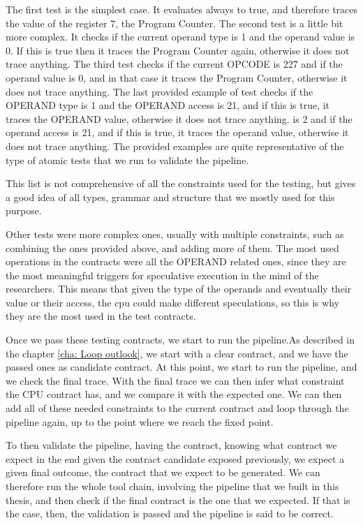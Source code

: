 The first test is the simplest case. It evaluates always to true, and therefore traces
the value of the register 7, the Program Counter. The second test is a little bit
more complex. It checks if the current operand type is 1 and the operand value
is 0. If this is true then it traces the Program Counter again, otherwise it does
not trace anything. The third test checks if the current OPCODE is 227 and if
the operand value is 0, and in that case it traces the Program Counter,
otherwise it does not trace anything. The last provided example of test checks if
the OPERAND type is 1 and the OPERAND access is 21, and if this is true, it traces
the OPERAND value, otherwise it does not trace anything. is 2 and if the operand
access is 21, and if this is true, it traces the operand value, otherwise it
does not trace anything. The provided examples are quite representative of the type
of atomic tests that we run to validate the pipeline.

This list is not comprehensive of all the constraints used for the testing, but
gives a good idea of all types, grammar and structure that we mostly used for this
purpose.

Other tests were more complex ones, usually with multiple constraints, such as combining
the ones provided above, and adding more of them. The most used operations in the
contracts were all the OPERAND related ones, since they are the most meaningful
triggers for speculative execution in the mind of the researchers. This means that
given the type of the operands and eventually their value or their access, the
cpu could make different speculations, so this is why they are the most used in the
test contracts.

Once we pass these testing contracts, we start to run the pipeline.As described
in the chapter \ref{cha: Loop outlook}, we start with a clear contract, and we
have the passed ones as candidate contract. At this point, we start to run the
pipeline, and we check the final trace. With the final trace we can then infer
what constraint the CPU contract has, and we compare it with the expected one.
We can then add all of these needed constraints to the current contract and loop
through the pipeline again, up to the point where we reach the fixed point.

To then validate the pipeline, having the contract, knowing what contract we expect
in the end given the contract candidate exposed previously, we expect a given
final outcome, the contract that we expect to be generated. We can therefore run
the whole tool chain, involving the pipeline that we built in this thesis, and
then check if the final contract is the one that we expected. If that is the case,
then, the validation is passed and the pipeline is said to be correct.

